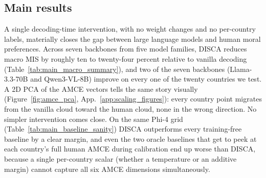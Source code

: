 \documentclass{article}
\begin{document}
\vspace{-0.1cm}
\subsection{Main results}
\label{sec:percountry_main}
\label{sec:robustness}
\vspace{-0.1cm}

A single decoding-time intervention, with no weight changes and no per-country labels, materially closes the gap between large language models and human moral preferences. Across seven backbones from five model families, DISCA reduces macro MIS by roughly ten to twenty-four percent relative to vanilla decoding (Table~\ref{tab:main_macro_summary}), and two of the seven backbones (Llama-3.3-70B and Qwen3-VL-8B) improve on every one of the twenty countries we test. A 2D PCA of the AMCE vectors tells the same story visually (Figure~\ref{fig:amce_pca}, App.~\ref{app:scaling_figures}): every country point migrates from the vanilla cloud toward the human cloud, none in the wrong direction. No simpler intervention comes close. On the same Phi-4 grid (Table~\ref{tab:main_baseline_sanity}) DISCA outperforms every training-free baseline by a clear margin, and even the two oracle baselines that get to peek at each country's full human AMCE during calibration end up worse than DISCA, because a single per-country scalar (whether a temperature or an additive margin) cannot capture all six AMCE dimensions simultaneously.
\end{document}
